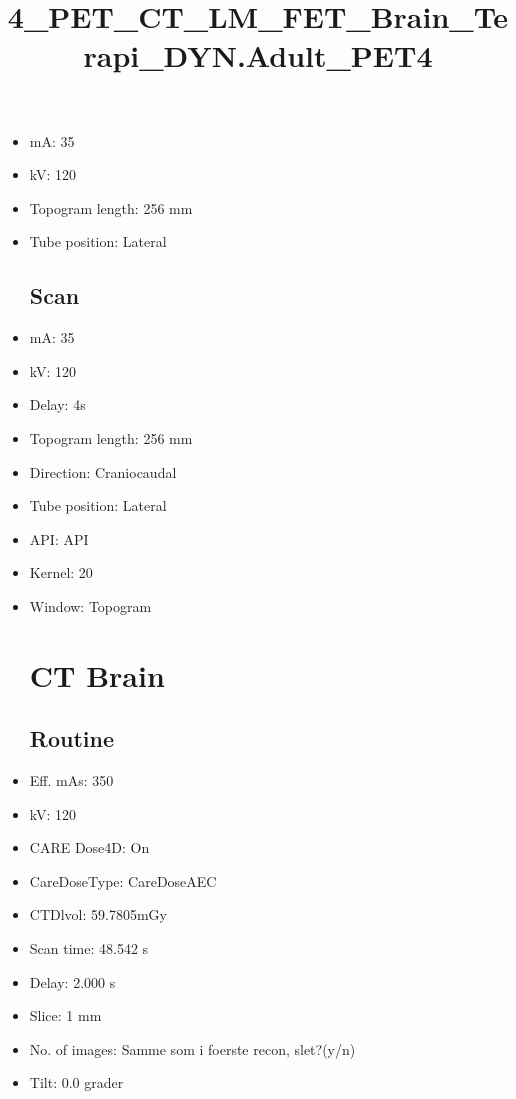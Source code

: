 \documentclass[12pt]{article}
\title{4\_PET\_CT\_LM\_FET\_Brain\_Terapi\_DYN.Adult\_PET4}
\begin{document}
\maketitle
\newpage
\tableofcontents
\newpage
{}


\begin{itemize}[noitemsep]\section{Topogram}
\subsection{Routine}
\item mA: 35\item kV: 120\item Topogram length: 256 mm\item Tube position: Lateral
\subsection{Scan}\item mA: 35\item kV: 120\item Delay: 4s\item Topogram length: 256 mm\item Direction: Craniocaudal\item Tube position: Lateral\item API: API \item Kernel: 20\item Window: Topogram
\section{CT Brain}
\subsection{Routine}
\item Eff. mAs: 350\item kV: 120\item CARE Dose4D: On\item CareDoseType: CareDoseAEC\item CTDlvol: 59.7805mGy\item Scan time: 48.542 s\item Delay: 2.000 s\item Slice: 1 mm\item No. of images: Samme som i foerste recon, slet?(y/n)\item Tilt: 0.0 grader

\end{itemize}
\end{document}
